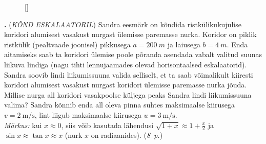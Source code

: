 \documentclass[11pt,a5paper]{article}
\newcommand{\numb}[1]{\vspace{5pt}\textbf{\large #1}}
\newcommand{\nimi}[1]{(\textsl{\small #1})}
\newcommand{\punktid}[1]{(\emph{#1~p.})}
\newcounter{ylesanne}
\newcommand{\yl}[1]{\addtocounter{ylesanne}{1}\numb{\theylesanne.} \nimi{#1} \newblock{}}
\newcommand{\autor}[1]{}%
\begin{document}
\begin{figure}
\raisebox{-5pt}[\dimexpr{}\baselineskip\relax]{
}
\end{figure}

\yl{KÕND ESKALAATORIL} 
Sandra eesmärk on kõndida ristkülikukujulise koridori alumisest vasakust nurgast ülemisse paremasse nurka. Koridor on piklik ristkülik  (pealtvaade joonisel) pikkusega $a = \SI{200}{m}$ ja laiusega $b = \SI{4}{m}$. Enda aitamiseks saab ta koridori ülemise poole põranda asendada vabalt valitud suunas liikuva lindiga (nagu tihti lennujaamades olevad horisontaalsed eskalaatorid). Sandra soovib lindi liikumissuuna valida selliselt, et ta saab võimalikult kiiresti koridori alumisest vasakust nurgast koridori ülemisse paremasse nurka jõuda. Millise nurga all koridori vasakpoolse küljega peaks Sandra lindi liikumissuuna valima? Sandra kõnnib enda all oleva pinna suhtes maksimaalse kiirusega $v = \SI{2}{\meter \per \second}$, lint liigub maksimaalse kiirusega $u = \SI{3}{\meter \per \second}$.\\
\emph{Märkus:} kui $x \approx 0$, siis võib kasutada lähendusi $\sqrt{1+x} \approx 1 + \frac{x}{2}$ ja $\sin{x} \approx \tan{x} \approx x$ (nurk $x$ on radiaanides).
\punktid{8} \autor{Kaarel Hänni}

\newpage
\end{document}
